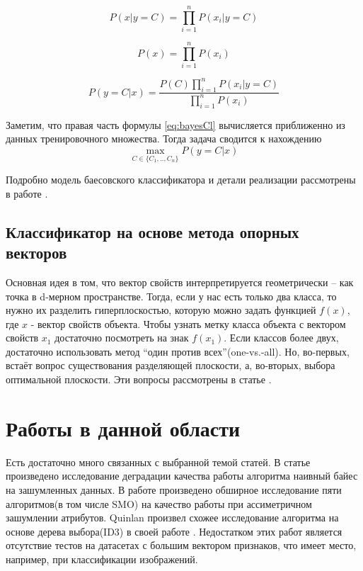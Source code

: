 \documentclass{article}
\begin{document}
\begin{equation}
P(x|y=C) = \prod_{i=1}^n{P(x_i|y=C)}
\end{equation}

\begin{equation}
P(x) = \prod_{i=1}^n{P(x_i)}
\end{equation}

\begin{equation}
\label{eq:bayesCl}
P(y=C|x)=\frac{P(C) \prod_{i=1}^n{P(x_i|y=C)}}{\prod_{i=1}^n{P(x_i)}}
\end{equation}

Заметим, что правая часть формулы \eqref{eq:bayesCl} вычисляется приближенно из данных тренировочного множества.
Тогда задача сводится к нахождению
\begin{equation}
\max_{C \in \{C_1,..,C_n\}}P(y=C|x)
\end{equation}

Подробно модель баесовского классификатора и детали реализации рассмотрены в работе
\cite{murphy2006naive}.

\subsection{Классификатор на основе метода опорных\\ векторов}
Основная идея в том, что вектор свойств интерпретируется геометрически --  как точка в d-мерном пространстве. Тогда, если у нас есть только два класса, то нужно их разделить гиперплоскостью, которую можно задать функцией $f(x)$, где $x$ - вектор свойств объекта. Чтобы узнать метку класса объекта с вектором свойств $x_1$ достаточно посмотреть на знак $f(x_1)$. Если классов более двух, достаточно использовать метод ``один против всех''(one-vs.-all). Но, во-первых, встаёт вопрос существования разделяющей плоскости, а, во-вторых, выбора оптимальной плоскости. Эти вопросы рассмотрены в статье \cite{svm}.


 
\section{Работы в данной области}
Есть достаточно много связанных с выбранной темой статей. В статье \cite{glick2004enrichment} произведено исследование деградации качества работы алгоритма наивный байес на зашумленных данных. В работе \cite{Mannino2009743} произведено обширное исследование пяти алгоритмов(в том числе SMO) на качество работы при ассиметричном зашумлении атрибутов. Quinlan произвел схожее исследование алгоритма на основе дерева выбора(ID3) в своей работе \cite{QuinlanTrees}. Недостатком этих работ является отсутствие тестов на датасетах с большим вектором признаков, что имеет место, например, при классификации изображений.
\end{document}
